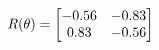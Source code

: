 \documentclass[preview]{standalone}
\begin{document}
\begin{align*}
\special{dvisvgm:raw <g id='unique000'>}R(\theta) = \begin{bmatrix}-0.56 & -0.83\\0.83 & -0.56\end{bmatrix}\special{dvisvgm:raw </g>}
\end{align*}
\end{document}
